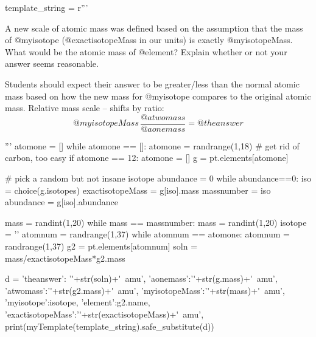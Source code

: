 

\begin{pycode}
template_string = r'''


A new scale of atomic mass was defined based on the assumption 
that the mass of @myisotope (@exactisotopeMass in our units) is exactly 
@myisotopeMass. What would be the atomic mass of @element? Explain 
whether or not your answer seems reasonable. 
\answerline[@theanswer] 


\begin{solution}
Students should expect their answer to be greater/less than the normal 
atomic mass based on how the new mass for @myisotope{} compares to the 
original atomic mass. Relative mass scale -- shifts by ratio: 
\[@myisotopeMass\,\frac{@atwomass}{@aonemass}=@theanswer\]
\end{solution}
  
'''
atomone = []
while atomone == []: 
    atomone = randrange(1,18)
    # get rid of carbon, too easy
    if atomone == 12:
        atomone = []
g = pt.elements[atomone]

# pick a random but not insane isotope
abundance = 0
while abundance==0:
    iso = choice(g.isotopes)
    exactisotopeMass = g[iso].mass
    massnumber = iso
    abundance = g[iso].abundance

mass = randint(1,20)
while mass == massnumber:
    mass = randint(1,20)
isotope = ''
atomnum = randrange(1,37)
while atomnum == atomone:
    atomnum = randrange(1,37)
g2 = pt.elements[atomnum]
soln = mass/exactisotopeMass*g2.mass

d = {'theanswer': '\SI{'+str(soln)+'}{amu}',
  'aonemass':'\SI{'+str(g.mass)+'}{amu}',
  'atwomass':'\SI{'+str(g2.mass)+'}{amu}',
  'myisotopeMass':'\SI{'+str(mass)+'}{amu}',
  'myisotope':isotope,
  'element':g2.name,
  'exactisotopeMass':'\SI{'+str(exactisotopeMass)+'}{amu}',
      }
print(myTemplate(template_string).safe_substitute(d))
\end{pycode}


